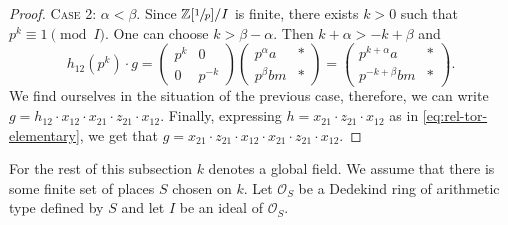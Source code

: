 \documentclass[oneside, 12pt]{amsart}
\theoremstyle{plain}
\numberwithin{equation}{section}
\numberwithin{lemma}{section}
\theoremstyle{definition}
\theoremstyle{remark}
\begin{document}
\begin{proof}
\textsc{Case 2:} $\alpha<\beta$. 
Since $\mathbb{Z}[\sfrac{1}{p}]/I$ is finite, there exists $k>0$ such that $p^k\equiv 1\pmod I$.
One can choose $k>\beta-\alpha$.
Then $k+\alpha>-k+\beta$ and
\[ h_{12}\left(p^k\right)\cdot g =
\begin{pmatrix} p^k & 0 \\ 0 & p^{-k} \end{pmatrix}
\begin{pmatrix} p^\alpha a & * \\ p^\beta bm & * \end{pmatrix}=
\begin{pmatrix} p^{k+\alpha} a & * \\ p^{-k+\beta} bm & * \end{pmatrix}. \]
We find ourselves in the situation of the previous case, therefore, we can write $g=h_{12}\cdot x_{12} \cdot x_{21} \cdot z_{21} \cdot x_{12}$.
Finally, expressing $h=x_{21}\cdot z_{21}\cdot x_{12}$ as in \eqref{eq:rel-tor-elementary}, we get that $g=x_{21} \cdot z_{21} \cdot x_{12} \cdot x_{21} \cdot z_{21} \cdot x_{12}$.
\end{proof}

For the rest of this subsection $k$ denotes a global field. We assume that there is some finite set of places $S$ chosen on $k$. 
Let $\mathcal{O}_S$ be a Dedekind ring of arithmetic type defined by $S$ and let $I$ be an ideal of $\mathcal{O}_S$.
\end{document}
